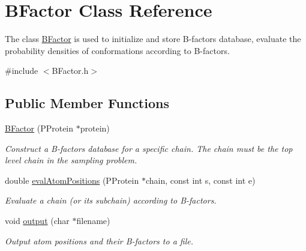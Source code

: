 \hypertarget{classBFactor}{\section{B\-Factor Class Reference}
\label{classBFactor}
}


The class \hyperlink{classBFactor}{B\-Factor} is used to initialize and store B-\/factors database, evaluate the probability densities of conformations according to B-\/factors.  




{\ttfamily \#include $<$B\-Factor.\-h$>$}

\subsection*{Public Member Functions}
\begin{DoxyCompactItemize}
\item 
\hypertarget{classBFactor_a91f2c9fcac4abc6be3374ef211567763}{\hyperlink{classBFactor_a91f2c9fcac4abc6be3374ef211567763}{B\-Factor} (P\-Protein $\ast$protein)}\label{classBFactor_a91f2c9fcac4abc6be3374ef211567763}

\begin{DoxyCompactList}\small\item\em Construct a B-\/factors database for a specific chain. The chain must be the top level chain in the sampling problem. \end{DoxyCompactList}\item 
double \hyperlink{classBFactor_a6b7a1d4d58a97a8c85e5965d893f8072}{eval\-Atom\-Positions} (P\-Protein $\ast$chain, const int s, const int e)
\begin{DoxyCompactList}\small\item\em Evaluate a chain (or its subchain) according to B-\/factors. \end{DoxyCompactList}\item 
void \hyperlink{classBFactor_afcf1c404118d984d5e8298efb6c582c3}{output} (char $\ast$filename)
\begin{DoxyCompactList}\small\item\em Output atom positions and their B-\/factors to a file. \end{DoxyCompactList}\end{DoxyCompactItemize}

